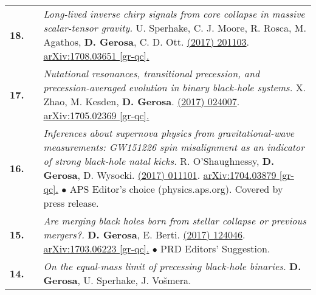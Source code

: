 {\begin{longtable}{rp{0.3cm}p{15.8cm}}
%
\textbf{18.} & & \textit{Long-lived inverse chirp signals from core collapse in massive scalar-tensor gravity.}
\newline{}
U. Sperhake, C. J. Moore, R. Rosca, M. Agathos, \textbf{D. Gerosa}, C. D. Ott.
\newline{}
\href{http://dx.doi.org/10.1103/PhysRevLett.119.201103}{\prl 119 (2017) 201103}. \href{https://arxiv.org/abs/1708.03651}{arXiv:1708.03651 [gr-qc].}
\vspace{0.09cm}\\
%
\textbf{17.} & & \textit{Nutational resonances, transitional precession, and precession-averaged evolution in binary black-hole systems.}
\newline{}
X. Zhao, M. Kesden, \textbf{D. Gerosa}.
\newline{}
\href{http://dx.doi.org/10.1103/PhysRevD.96.024007}{\prd 96 (2017) 024007}. \href{https://arxiv.org/abs/1705.02369}{arXiv:1705.02369 [gr-qc].}
\vspace{0.09cm}\\
%
\textbf{16.} & & \textit{Inferences about supernova physics from gravitational-wave measurements: GW151226 spin misalignment as an indicator of strong black-hole natal kicks.}
\newline{}
R. O'Shaughnessy, \textbf{D. Gerosa}, D. Wysocki.
\newline{}
\href{http://dx.doi.org/10.1103/PhysRevLett.119.011101}{\prl 119 (2017) 011101}. \href{https://arxiv.org/abs/1704.03879}{arXiv:1704.03879 [gr-qc].}
\newline{}
\textcolor{color1}{$\bullet$} APS Editor's choice (physics.aps.org). Covered by press release.
\vspace{0.09cm}\\
%
\textbf{15.} & & \textit{Are merging black holes born from stellar collapse or previous mergers?.}
\newline{}
\textbf{D. Gerosa}, E. Berti.
\newline{}
\href{http://dx.doi.org/10.1103/PhysRevD.95.124046}{\prd 95 (2017) 124046}. \href{https://arxiv.org/abs/1703.06223}{arXiv:1703.06223 [gr-qc].}
\newline{}
\textcolor{color1}{$\bullet$} PRD Editors' Suggestion.
\vspace{0.09cm}\\
%
\textbf{14.} & & \textit{On the equal-mass limit of precessing black-hole binaries.}
\newline{}
\textbf{D. Gerosa}, U. Sperhake, J. Vo\v{s}mera.
\newline{}

\end{longtable}}
